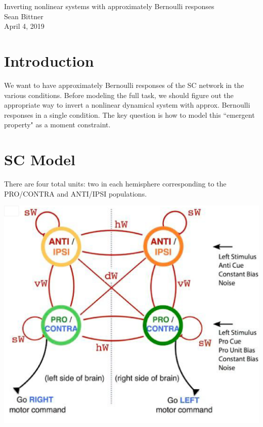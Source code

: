 \documentclass[11pt]{article}
\begin{document}
\medskip                        %

\thispagestyle{plain}
\begin{center}                  %
{\Large Inverting nonlinear systems with approximately Bernoulli responses} \\
Sean Bittner \\
April 4, 2019 \\
\end{center}

\section{Introduction}
We want to have approximately Bernoulli responses of the SC network in the various conditions.  Before modeling the full task, we should figure out the appropriate way to invert a nonlinear dynamical system with approx. Bernoulli responses in a single condition.  The key question is how to model this ``emergent property" as a moment constraint.  

\section{SC Model}
There are four total units: two in each hemisphere corresponding to the PRO/CONTRA and ANTI/IPSI populations. \\
\begin{center}
\includegraphics[scale=0.3]{figs/Duan_2019_Fig6_clean.png} 
\end{center}
\end{document}
